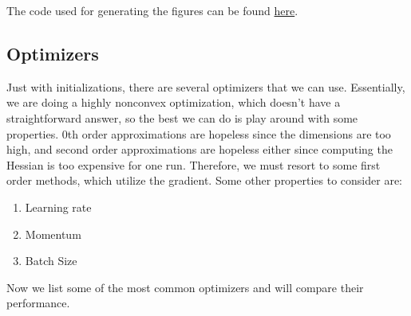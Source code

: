 \documentclass{article}
\begin{document}
    \begin{code} 
      The code used for generating the figures can be found \href{code/initialization.ipynb}{here}. 
    \end{code}
    
  \subsection{Optimizers}

    Just with initializations, there are several optimizers that we can use. Essentially, we are doing a highly nonconvex optimization, which doesn't have a straightforward answer, so the best we can do is play around with some properties. 0th order approximations are hopeless since the dimensions are too high, and second order approximations are hopeless either since computing the Hessian is too expensive for one run. Therefore, we must resort to some first order methods, which utilize the gradient. Some other properties to consider are: 
    \begin{enumerate} 
      \item Learning rate 
      \item Momentum 
      \item Batch Size
    \end{enumerate}

    Now we list some of the most common optimizers and will compare their performance. 

    \begin{definition}
      
    \end{definition}

    \begin{definition}[Adam]
      
    \end{definition}

    \begin{definition}[RMSProp]
      
    \end{definition}

    \begin{definition}[Adagrad]
      
    \end{definition}

    \begin{definition}
      
    \end{definition}
\end{document}
